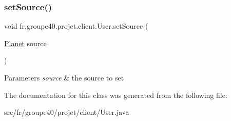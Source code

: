 \subsubsection{\texorpdfstring{set\+Source()}{setSource()}}
{\footnotesize\ttfamily void fr.\+groupe40.\+projet.\+client.\+User.\+set\+Source (\begin{DoxyParamCaption}\item[{\hyperlink{classfr_1_1groupe40_1_1projet_1_1model_1_1planets_1_1_planet}{Planet}}]{source }\end{DoxyParamCaption})}


\begin{DoxyParams}{Parameters}
{\em source} & the source to set \\
\hline
\end{DoxyParams}


The documentation for this class was generated from the following file\+:\begin{DoxyCompactItemize}
\item 
src/fr/groupe40/projet/client/User.\+java\end{DoxyCompactItemize}
